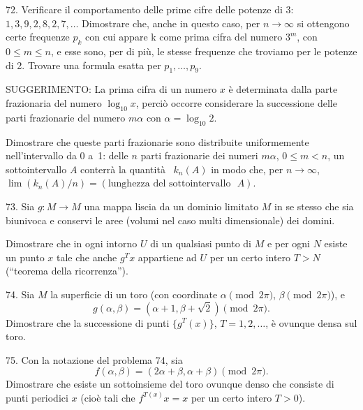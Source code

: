 \begin{problem}{72.}
	Verificare il comportamento delle prime cifre delle potenze di 3: $1,
	3, 9, 2, 8, 2, 7, \dotsc$ Dimostrare che, anche in questo caso, per $n \to \infty$
si ottengono certe frequenze $p_{k}$ con cui appare k come prima cifra del numero  $3^m$, con
	$0\leqslant m \leqslant n$, e esse sono, per di più, le stesse frequenze che troviamo per le potenze di 2. Trovare una formula esatta per $p_1, \dotsc, p_9$.

	\begin{note}{SUGGERIMENTO:}
		La prima cifra di un numero $x$ è determinata dalla parte frazionaria del numero $\log_{10} x$, perciò occorre considerare la successione delle parti frazionarie del numero          $m \alpha$ con $\alpha=\log_{10} 2$.
	\end{note}
	Dimostrare che queste parti frazionarie sono distribuite uniformemente nell’intervallo da 0 a~1: delle $n$ parti frazionarie dei numeri $m \alpha$, $0 \leqslant m<n$,
	un sottointervallo $A$ conterrà la quantità ~$k_n (A)$ in modo che, per $n \to \infty$,
	$\lim (k_n (A)/n)=(\text{lunghezza del sottointervallo ~$A$})$.
\end{problem}

\begin{problem}{73.}
	Sia $g\colon M \to M$ una mappa liscia da un dominio limitato $M$ in se stesso che sia biunivoca e conservi le aree (volumi nel caso multi dimensionale) dei domini.

	Dimostrare che in ogni intorno $U$ di un qualsiasi punto di $M$ e per ogni $N$ esiste un punto $x$
	tale che anche $g^T x$ appartiene ad $U$ per un certo intero $T>N$ (\enquote{teorema della ricorrenza}).
\end{problem}

\begin{problem}{74.}
	Sia $M$ la superficie di un toro (con coordinate $\alpha \pmod{2\pi}$, $\beta \pmod{2\pi}$), 
	e
	\begin{equation*}
		g(\alpha, \beta)=(\alpha+1, \beta+ \sqrt{2}) \pmod{2\pi}.
	\end{equation*}
	Dimostrare che la successione di punti 
	$\{g^T (x)\}$, $T=1, 2, \dotsc$, è ovunque densa sul toro.
\end{problem}

\begin{problem}{75.}
	Con la notazione del problema 74, sia
	\begin{equation*}
		f(\alpha, \beta)=(2\alpha+\beta,\alpha+\beta) \pmod{2\pi}.
	\end{equation*}
	Dimostrare che esiste un sottoinsieme del toro ovunque denso che consiste di punti periodici  $x$ (cioè tali che
	$f^{T (x)} x=x$ per un certo intero $T>0$).
\end{problem}

